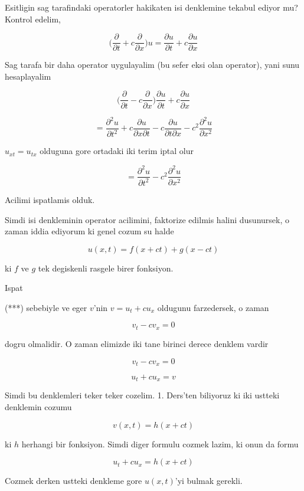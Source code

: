 \documentclass[12pt,fleqn]{article}
\begin{document}
Esitligin sag tarafindaki operatorler hakikaten isi denklemine tekabul
ediyor mu? Kontrol edelim, 

\[ \bigg( \frac{\partial }{\partial t} + c \frac{\partial }{\partial x}
\bigg) u = 
\frac{\partial u}{\partial t} + c \frac{\partial u}{\partial x}
\]

Sag tarafa bir daha operator uygulayalim (bu sefer eksi olan operator),
yani sunu hesaplayalim

\[ 
\bigg( \frac{\partial }{\partial t} - c \frac{\partial }{\partial x} \bigg)
\frac{\partial u}{\partial t} + c \frac{\partial u}{\partial x} 
 \]

\[ = 
\frac{\partial ^2 u}{\partial t^2} + 
c \frac{\partial u}{\partial x \partial t} - 
c \frac{\partial u}{\partial t \partial x} - 
c^2\frac{\partial ^2 u}{\partial x^2} 
 \]

$u_{xt} = u_{tx}$ olduguna gore ortadaki iki terim iptal olur

\[ = 
\frac{\partial ^2 u}{\partial t^2} -
c^2\frac{\partial ^2 u}{\partial x^2} 
 \]

Acilimi ispatlamis olduk. 

Simdi isi denkleminin operator acilimini, faktorize edilmis halini
dusunursek, o zaman iddia ediyorum ki genel cozum su halde

\[ u(x,t) = f(x+ct) + g(x-ct) \]

ki $f$ ve $g$ tek degiskenli rasgele birer fonksiyon. 

Ispat

(***) sebebiyle ve eger $v$'nin $v = u_t + cu_x$ oldugunu farzedersek, o zaman 

\[ v_t - cv_x = 0 \]

dogru olmalidir. O zaman elimizde iki tane birinci derece denklem vardir

\[ v_t - cv_x = 0 \]

\[ u_t + cu_x = v \]

Simdi bu denklemleri teker teker cozelim. 1. Ders'ten biliyoruz ki iki
ustteki denklemin cozumu 

\[ v(x,t) = h(x+ ct) \]

ki $h$ herhangi bir fonksiyon. Simdi diger formulu cozmek lazim, ki onun
da formu

\[ u_t + cu_x = h(x + ct)  \]

Cozmek derken ustteki denkleme gore $u(x,t)$'yi bulmak gerekli. 
\end{document}
